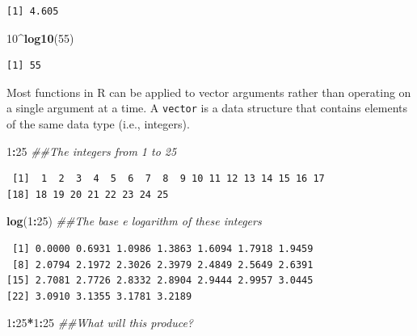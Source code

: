 \documentclass[
]{krantz}
\makeatletter
\newenvironment{Shaded}{\begin{snugshade}}{\end{snugshade}}
\newcommand{\CommentTok}[1]{\textcolor[rgb]{0.37,0.37,0.37}{\textit{#1}}}
\newcommand{\DecValTok}[1]{\textcolor[rgb]{0.06,0.06,0.06}{#1}}
\newcommand{\KeywordTok}[1]{\textcolor[rgb]{0.27,0.27,0.27}{\textbf{#1}}}
\newcommand{\NormalTok}[1]{#1}
\newcommand{\OperatorTok}[1]{\textcolor[rgb]{0.43,0.43,0.43}{\textbf{#1}}}
\newenvironment{kframe}{%
\medskip{}
\setlength{\fboxsep}{.8em}
 \def\at@end@of@kframe{}%
 \ifinner\ifhmode%
  \def\at@end@of@kframe{\end{minipage}}%
  \begin{minipage}{\columnwidth}%
 \fi\fi%
 \def\FrameCommand##1{\hskip\@totalleftmargin \hskip-\fboxsep
 \colorbox{shadecolor}{##1}\hskip-\fboxsep
     \hskip-\linewidth \hskip-\@totalleftmargin \hskip\columnwidth}%
 \MakeFramed {\advance\hsize-\width
   \@totalleftmargin\z@ \linewidth\hsize
   \@setminipage}}%
 {\par\unskip\endMakeFramed%
 \at@end@of@kframe}
\renewenvironment{Shaded}{\begin{kframe}}{\end{kframe}}
\makeatother
\begin{document}
\begin{verbatim}
[1] 4.605
\end{verbatim}

\begin{Shaded}
\begin{Highlighting}[]
\DecValTok{10}\OperatorTok{\^{}}\KeywordTok{log10}\NormalTok{(}\DecValTok{55}\NormalTok{)}
\end{Highlighting}
\end{Shaded}

\begin{verbatim}
[1] 55
\end{verbatim}

Most functions in R can be applied to vector arguments rather than operating on a single argument at a time. A \texttt{vector} is a data structure that contains elements of the same data type (i.e., integers).

\begin{Shaded}
\begin{Highlighting}[]
\DecValTok{1}\OperatorTok{:}\DecValTok{25} \CommentTok{\#\#The integers from 1 to 25}
\end{Highlighting}
\end{Shaded}

\begin{verbatim}
 [1]  1  2  3  4  5  6  7  8  9 10 11 12 13 14 15 16 17
[18] 18 19 20 21 22 23 24 25
\end{verbatim}

\begin{Shaded}
\begin{Highlighting}[]
\KeywordTok{log}\NormalTok{(}\DecValTok{1}\OperatorTok{:}\DecValTok{25}\NormalTok{) }\CommentTok{\#\#The base e logarithm of these integers}
\end{Highlighting}
\end{Shaded}

\begin{verbatim}
 [1] 0.0000 0.6931 1.0986 1.3863 1.6094 1.7918 1.9459
 [8] 2.0794 2.1972 2.3026 2.3979 2.4849 2.5649 2.6391
[15] 2.7081 2.7726 2.8332 2.8904 2.9444 2.9957 3.0445
[22] 3.0910 3.1355 3.1781 3.2189
\end{verbatim}

\begin{Shaded}
\begin{Highlighting}[]
\DecValTok{1}\OperatorTok{:}\DecValTok{25}\OperatorTok{*}\DecValTok{1}\OperatorTok{:}\DecValTok{25} \CommentTok{\#\#What will this produce?}
\end{Highlighting}
\end{Shaded}
\end{document}
